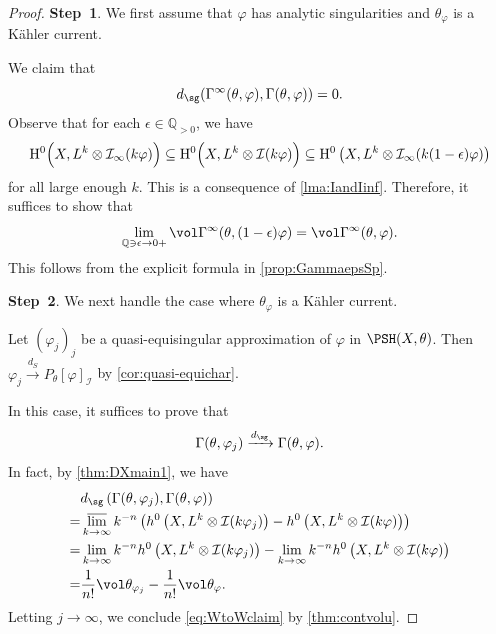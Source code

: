\begin{proof}
    \textbf{Step~1}. We first assume that $\varphi$ has analytic singularities and $\theta_{\varphi}$ is a Kähler current.

    We claim that
    \begin{equation}\label{eq:Gamma0Gammaanalytic}
        d_{\sg}(\Gamma^{\infty}(\theta,\varphi),\Gamma(\theta,\varphi))=0.
    \end{equation}
    Observe that for each $\epsilon\in \mathbb{Q}_{>0}$, we have
    \[
    \mathrm{H}^0\Bigl(X,L^k\otimes \mathcal{I}_{\infty}(k\varphi)\Bigr)\subseteq \mathrm{H}^0\Bigl(X,L^k\otimes \mathcal{I}(k\varphi)\Bigr)\subseteq \mathrm{H}^0\left(X,L^k\otimes \mathcal{I}_{\infty}(k(1-\epsilon)\varphi)\right)
    \]
    for all large enough $k$. This is a consequence of \cref{lma:IandIinf}. Therefore, it suffices to show that
    \[
    \lim_{\mathbb{Q}\ni \epsilon\to 0+}\vol \Gamma^{\infty}(\theta,(1-\epsilon)\varphi)=\vol \Gamma^{\infty}(\theta,\varphi).
    \]
    This follows from the explicit formula in \cref{prop:GammaepsSp}.

    \textbf{Step~2}. We next handle the case where $\theta_{\varphi}$ is a Kähler current.

    Let $(\varphi_j)_j$ be a quasi-equisingular approximation of $\varphi$ in $\PSH(X,\theta)$. Then $\varphi_j\xrightarrow{d_S}P_{\theta}[\varphi]_{\mathcal{I}}$ by \cref{cor:quasi-equichar}.

In this case, it suffices to prove that
\begin{equation}\label{eq:WtoWclaim}
	\Gamma(\theta,\varphi_j)\xrightarrow{d_{\sg}} \Gamma(\theta,\varphi).
\end{equation}
In fact, by \cref{thm:DXmain1}, we have
\[
	\begin{aligned}
		&d_{\sg}\left(\Gamma(\theta,\varphi_j),\Gamma(\theta,\varphi)\right) \\
  =& \varlimsup_{k\to\infty} k^{-n} \left( h^0\left(X,L^k\otimes \mathcal{I}(k\varphi_j)\right)-h^0\left(X,L^k\otimes \mathcal{I}(k\varphi)\right)\right)\\
  = & \lim_{k\to\infty} k^{-n}h^0\left(X,L^k\otimes \mathcal{I}(k\varphi_j)\right)-\lim_{k\to\infty} k^{-n}h^0\left(X,L^k\otimes \mathcal{I}(k\varphi)\right) \\
		 =&\frac{1}{n!}\vol \theta_{\varphi_j}-\frac{1}{n!}\vol \theta_{\varphi}.
	\end{aligned}
\]
Letting $j\to\infty$, we conclude \eqref{eq:WtoWclaim} by \cref{thm:contvolu}.


\end{proof}
